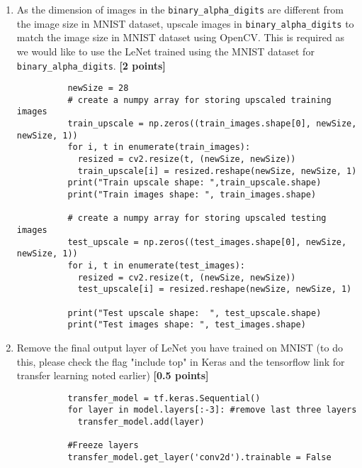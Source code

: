 \begin{enumerate}
\begin{lstlisting}
          train_images, train_labels = tfds.as_numpy(train_ds)
          test_images, test_labels   = tfds.as_numpy(test_ds)

          print('Image size:', train_images[0].shape)
          print('Training data size:',train_images.shape)
          print('Training labels size:', train_labels.shape)
          print('Testing data size:', test_images.shape)
        \end{lstlisting}
  \item As the dimension of images in the \lstinline{binary_alpha_digits} are different from the image size in MNIST dataset, upscale images in \lstinline{binary_alpha_digits} to match the image size in MNIST dataset using OpenCV. This is required as we would like to use the LeNet trained using the MNIST dataset for \lstinline{binary_alpha_digits}. {\bf [2 points]}
        \begin{lstlisting}
          newSize = 28
          # create a numpy array for storing upscaled training images
          train_upscale = np.zeros((train_images.shape[0], newSize, newSize, 1))
          for i, t in enumerate(train_images):
            resized = cv2.resize(t, (newSize, newSize))
            train_upscale[i] = resized.reshape(newSize, newSize, 1)
          print("Train upscale shape: ",train_upscale.shape)
          print("Train images shape: ", train_images.shape)

          # create a numpy array for storing upscaled testing images
          test_upscale = np.zeros((test_images.shape[0], newSize, newSize, 1))
          for i, t in enumerate(test_images):
            resized = cv2.resize(t, (newSize, newSize))
            test_upscale[i] = resized.reshape(newSize, newSize, 1)

          print("Test upscale shape:  ", test_upscale.shape)
          print("Test images shape: ", test_images.shape)
        \end{lstlisting}
  \item Remove the final output layer of LeNet you have trained on MNIST (to do this, please check the flag "include top" in Keras and the tensorflow link for transfer learning noted earlier) {\bf [0.5 points]}
        \begin{lstlisting}
          transfer_model = tf.keras.Sequential()
          for layer in model.layers[:-3]: #remove last three layers
            transfer_model.add(layer)

          #Freeze layers
          transfer_model.get_layer('conv2d').trainable = False


\end{lstlisting}
\end{enumerate}
